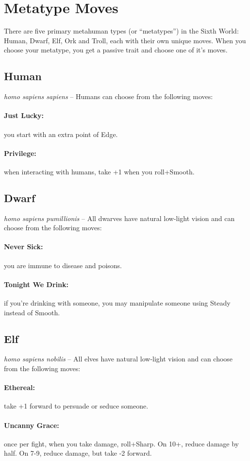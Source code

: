 \section{Metatype Moves}
There are five primary metahuman types (or ``metatypes'') in the Sixth World: Human, Dwarf, Elf, Ork and Troll, each with their own unique moves. When you choose your metatype, you get a passive trait and choose one of it's moves.

\subsection*{Human}
\textit{homo sapiens sapiens} -- Humans can choose from the following moves:
\paragraph{Just Lucky:} you start with an extra point of Edge.
\paragraph{Privilege:} when interacting with humans, take +1 when you roll+Smooth.

\subsection*{Dwarf}
\textit{homo sapiens pumillionis} -- All dwarves have natural low-light vision and can choose from the following moves:
\paragraph{Never Sick:} you are immune to disease and poisons.
\paragraph{Tonight We Drink:} if you’re drinking with someone, you may manipulate someone using Steady instead of Smooth.

\subsection*{Elf}
\textit{homo sapiens nobilis} -- All elves have natural low-light vision and can choose from the following moves:
\paragraph{Ethereal:} take +1 forward to persuade or seduce someone.
\paragraph{Uncanny Grace:} once per fight, when you take damage, roll+Sharp. On 10+, reduce damage by half. On 7-9, reduce damage, but take -2 forward.

